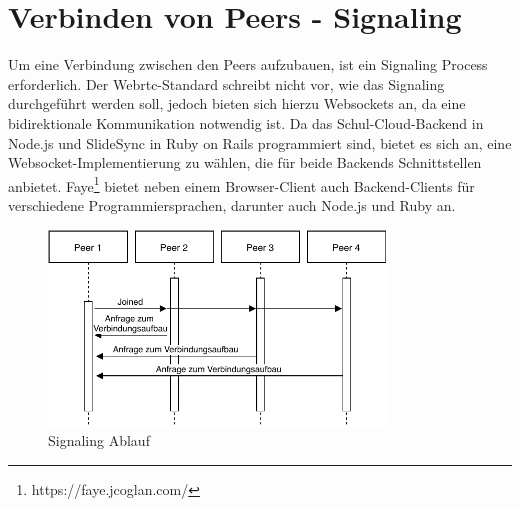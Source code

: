 
\section{Verbinden von Peers - Signaling}\label{k:signaling}
Um eine Verbindung zwischen den Peers aufzubauen, ist ein Signaling Process erforderlich. Der Webrtc-Standard schreibt nicht vor, wie das Signaling durchgeführt werden soll, jedoch bieten sich hierzu Websockets an, da eine bidirektionale Kommunikation notwendig ist. Da das Schul-Cloud-Backend in Node.js und SlideSync in Ruby on Rails programmiert sind, bietet es sich an, eine Websocket-Implementierung zu wählen, die für beide Backends Schnittstellen anbietet. Faye\footnote{https://faye.jcoglan.com/} bietet neben einem Browser-Client auch Backend-Clients für verschiedene Programmiersprachen, darunter auch Node.js und Ruby an.
\begin{figure}[!h]
	\centering
	\includegraphics[width=0.8\textwidth]{figures/Signaling}
	\caption[Signaling Ablau]{Signaling Ablauf}
	\label{fig:mesh}
\end{figure}

